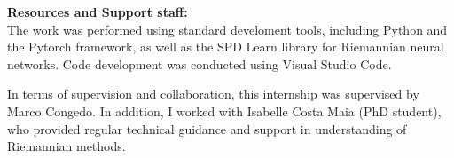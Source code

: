 \documentclass[11pt,a4paper]{article}
\begin{document}
\noindent \textbf{Resources and Support staff:} \\
The work was performed using standard develoment tools, including Python and the Pytorch framework, as well as the SPD Learn library for Riemannian neural networks. Code development was conducted using Visual Studio Code. 

\noindent In terms of supervision and collaboration, this internship was supervised by Marco Congedo. In addition, I worked with Isabelle Costa Maia (PhD student), who provided regular technical guidance and support in understanding of Riemannian methods. 
\end{document}
